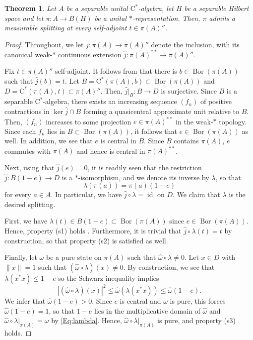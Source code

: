 \documentclass[10pt]{amsart}
\newcommand{\rC}{\mathrm{C}}
\newcommand{\id}{\operatorname{id}}
\newcommand{\Bor}{\operatorname{Bor}}
\newtheorem{theorem}[lemma]{Theorem}
\theoremstyle{definition}
\begin{document}
\begin{theorem}\label{T:meassplitexist}
Let $A$ be a separable unital $\rC^*$-algebra, let $H$ be a separable Hilbert space  and let $\pi:A\to B(H)$ be a unital $*$-representation. Then, $\pi$ admits a measurable splitting at every self-adjoint $t\in \pi(A)''$.
\end{theorem}
\begin{proof}
Throughout, we let $j:\pi(A)\to \pi(A)''$ denote the inclusion, with its canonical weak-$*$ continuous extension $\widehat j :\pi(A)^{**}\to \pi(A)''$.


Fix $t\in \pi(A)''$ self-adjoint. It follows from \cite[Corollary 4.5.10]{eilers2018c} that there is $b\in \Bor(\pi(A))$ such that $\widehat{j}(b)=t$. Let $B=\rC^*(\pi(A),b)\subset \Bor(\pi(A))$ and $D=\rC^*(\pi(A),t)\subset \pi(A)''$. Then, $\widehat j|_{B}:B\to D$ is surjective. Since $B$ is a separable $\rC^*$-algebra, there exists an increasing sequence $(f_n)$ of positive contractions in $\ker\widehat j\cap B$ forming a quasicentral approximate unit relative to $B$. Then, $(f_n)$ increases to some projection $e\in \pi(A)^{**}$ in the weak-$*$ topology. Since each $f_n$ lies in $B\subset \Bor(\pi(A))$, it follows that $e\in \Bor(\pi(A))$ as well. In addition, we see that $e$ is central in $B$. Since $B$ contains $\pi(A)$,  $e$ commutes with $\pi(A)$ and hence is central in $\pi(A)^{**}$.

Next, using that $\widehat j(e)=0$, it is readily seen that the restriction $\widehat j:B(1-e)\to D$ is a $*$-isomorphism, and we denote its inverse by $\lambda$, so that 
\begin{equation}\label{Eq:lambda}
\lambda(\pi(a))=\pi(a)(1-e)
\end{equation} 
for every $a\in A$. In particular, we have $\widehat j \circ \lambda=\id$ on $D$. 
We claim that $\lambda$ is the desired splitting.

First, we have $\lambda(t)\in B(1-e)\subset \Bor(\pi(A))$ since $e\in \Bor(\pi(A))$. Hence, property (s1) holds  \cite[Lemma 4.5.12]{eilers2018c}. Furthermore, it is trivial that $\widehat j\circ \lambda(t)=t$ by construction, so that property (s2) is satisfied as well.

Finally, let $\omega$ be a pure state on $\pi(A)$ such that $\widehat\omega \circ \lambda\neq 0$. Let $x\in D$ with $\|x\|=1$ such that $(\widehat\omega\circ \lambda)(x)\neq 0$. By construction, we see that $\lambda(x^*x)\leq 1-e$ so the Schwarz inequality implies 
\[
|(\widehat\omega \circ \lambda)(x)|^2\leq \widehat\omega(\lambda(x^*x))\leq \widehat\omega(1-e).
\]
We infer that $\widehat\omega(1-e)>0$. Since $e$ is central and $\omega$ is pure, this forces $\widehat\omega(1-e)=1$, so that $1-e$ lies in the multiplicative domain of $\widehat\omega$ and $\widehat\omega\circ\lambda|_{\pi(A)}=\omega$ by \eqref{Eq:lambda}. Hence, $\widehat\omega\circ\lambda|_{\pi(A)}$ is pure, and property (s3) holds.
\end{proof}
\end{document}

